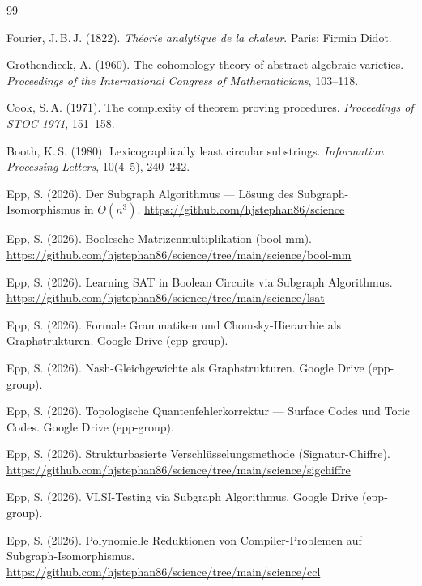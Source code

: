 ﻿\documentclass[a4paper,12pt]{article}
\theoremstyle{definition}
\begin{document}
\begin{thebibliography}{99}

Fourier, J.\,B.\,J. (1822).
\textit{Théorie analytique de la chaleur}.
Paris: Firmin Didot.

Grothendieck, A. (1960).
The cohomology theory of abstract algebraic varieties.
\textit{Proceedings of the International Congress of Mathematicians}, 103--118.

Cook, S.\,A. (1971).
The complexity of theorem proving procedures.
\textit{Proceedings of STOC 1971}, 151--158.

Booth, K.\,S. (1980).
Lexicographically least circular substrings.
\textit{Information Processing Letters}, 10(4--5), 240--242.

Epp, S. (2026).
Der Subgraph Algorithmus --- Lösung des Subgraph-Isomorphismus in $O(n^3)$.
\url{https://github.com/hjstephan86/science}

Epp, S. (2026).
Boolesche Matrizenmultiplikation (bool-mm).
\url{https://github.com/hjstephan86/science/tree/main/science/bool-mm}

Epp, S. (2026).
Learning SAT in Boolean Circuits via Subgraph Algorithmus.
\url{https://github.com/hjstephan86/science/tree/main/science/lsat}

Epp, S. (2026).
Formale Grammatiken und Chomsky-Hierarchie als Graphstrukturen.
Google Drive (epp-group).

Epp, S. (2026).
Nash-Gleichgewichte als Graphstrukturen.
Google Drive (epp-group).

Epp, S. (2026).
Topologische Quantenfehlerkorrektur --- Surface Codes und Toric Codes.
Google Drive (epp-group).

Epp, S. (2026).
Strukturbasierte Verschlüsselungsmethode (Signatur-Chiffre).
\url{https://github.com/hjstephan86/science/tree/main/science/sigchiffre}

Epp, S. (2026).
VLSI-Testing via Subgraph Algorithmus.
Google Drive (epp-group).

Epp, S. (2026).
Polynomielle Reduktionen von Compiler-Problemen auf Subgraph-Isomorphismus.
\url{https://github.com/hjstephan86/science/tree/main/science/ccl}


\end{thebibliography}
\end{document}
